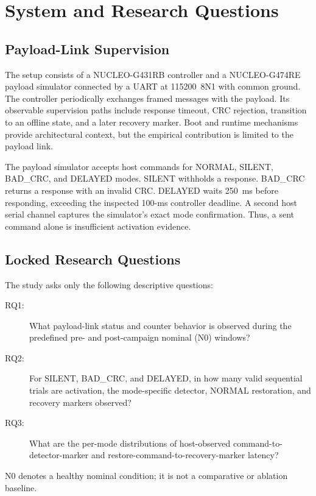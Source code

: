 \documentclass[conference]{IEEEtran}
\begin{document}
\section{System and Research Questions}

\subsection{Payload-Link Supervision}

The setup consists of a NUCLEO-G431RB controller and a NUCLEO-G474RE payload simulator connected by a UART at 115200~8N1 with common ground. The controller periodically exchanges framed messages with the payload. Its observable supervision paths include response timeout, CRC rejection, transition to an offline state, and a later recovery marker. Boot and runtime mechanisms provide architectural context, but the empirical contribution is limited to the payload link.

The payload simulator accepts host commands for NORMAL, SILENT, BAD\_CRC, and DELAYED modes. SILENT withholds a response. BAD\_CRC returns a response with an invalid CRC. DELAYED waits 250~ms before responding, exceeding the inspected 100-ms controller deadline. A second host serial channel captures the simulator's exact mode confirmation. Thus, a sent command alone is insufficient activation evidence.

\subsection{Locked Research Questions}

The study asks only the following descriptive questions:

\begin{description}
  \item[RQ1:] What payload-link status and counter behavior is observed during the predefined pre- and post-campaign nominal (N0) windows?
  \item[RQ2:] For SILENT, BAD\_CRC, and DELAYED, in how many valid sequential trials are activation, the mode-specific detector, NORMAL restoration, and recovery markers observed?
  \item[RQ3:] What are the per-mode distributions of host-observed command-to-detector-marker and restore-command-to-recovery-marker latency?
\end{description}

N0 denotes a healthy nominal condition; it is not a comparative or ablation baseline.
\end{document}
